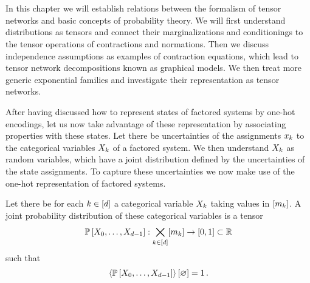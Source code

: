 \chapter{\chatextprobRepresentation}\label{cha:probRepresentation}

In this chapter we will establish relations between the formalism of tensor networks and basic concepts of probability theory.
We will first understand distributions as tensors and connect their marginalizations and conditionings to the tensor operations of contractions and normations.
Then we discuss independence assumptions as examples of contraction equations, which lead to tensor network decompositions known as graphical models.
We then treat more generic exponential families and investigate their representation as tensor networks.


After having discussed how to represent states of factored systems by one-hot encodings, let us now take advantage of these representation by associating properties with these states.
Let there be uncertainties of the assignments $x_{k}$ to the categorical variables $X_{k}$ of a factored system.
We then understand $X_{k}$ as random variables, which have a joint distribution defined by the uncertainties of the state assignments.
To capture these uncertainties we now make use of the one-hot representation of factored systems.

\begin{definition}
    \label{def:probabilityDistribution} %
    Let there be for each $k\in[d]$ a categorical variable $X_{k}$ taking values in $[m_{k}]$.
    A joint probability distribution of these categorical variables is a tensor
    \begin{align*}
        \mathbb{P}\left[X_{0},\ldots,X_{d-1}\right] : \bigtimes_{k\in[d]}[m_{k}] \rightarrow [0,1] \subset \mathbb{R}
    \end{align*}
    such that
    \begin{align*}
        \left\langle \mathbb{P}\left[X_{0},\ldots,X_{d-1}\right]\right\rangle \left[ \varnothing \right] = 1 \, .
    \end{align*}
\end{definition}

